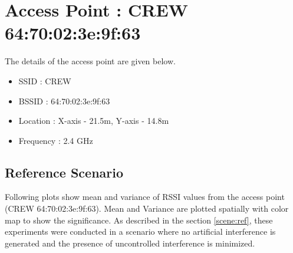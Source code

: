 \documentclass[11pt,a4paper,headinclude,footinclude,chapterprefix=on]{scrreprt}
\begin{document}
\pagebreak 
\section{Access Point : CREW 64:70:02:3e:9f:63} 
The details of the access point are given below.
\begin{itemize}
	\item SSID : CREW 
	\item BSSID : 64:70:02:3e:9f:63 
	\item Location : X-axis - 21.5m, Y-axis - 14.8m 
	\item Frequency : 2.4 GHz 
\end{itemize}
\subsection{Reference Scenario} 
Following plots show mean and variance of RSSI values from the access point (CREW 64:70:02:3e:9f:63). Mean and Variance are plotted spatially with color map to show the significance. As described in the section \ref{scene:ref}, these experiments were conducted in a scenario where no artificial interference is generated and the presence of uncontrolled interference is minimized.
\end{document}
